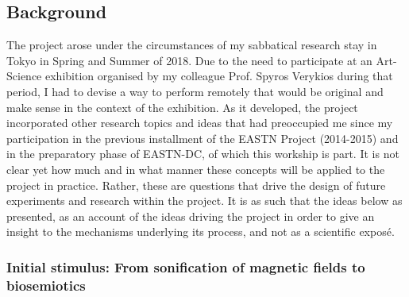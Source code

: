 \documentclass[11pt]{article}
\begin{document}
\subsection{Background}
\label{sec:orgcc201df}

The project arose under the circumstances of my sabbatical research stay in Tokyo in Spring and Summer of 2018.  Due to the need to participate at an Art-Science exhibition organised by my colleague Prof. Spyros Verykios during that period, I had to devise a way to perform remotely that would be original and make sense in the context of the exhibition. As it developed, the project incorporated other research topics and ideas that had preoccupied me since my participation in the previous installment of the EASTN Project (2014-2015) and in the preparatory phase of EASTN-DC, of which this workship is part.  It is not clear yet how much and in what manner these concepts will be applied to the project in practice.  Rather, these are questions that drive the design of future experiments and research within the project.  It is as such that the ideas below as presented, as an account of the ideas driving the project in order to give an insight to the mechanisms underlying its process, and not as a scientific exposé.

\subsubsection{Initial stimulus: From sonification of magnetic fields to biosemiotics}
\label{sec:orgdbe2a54}
\end{document}
